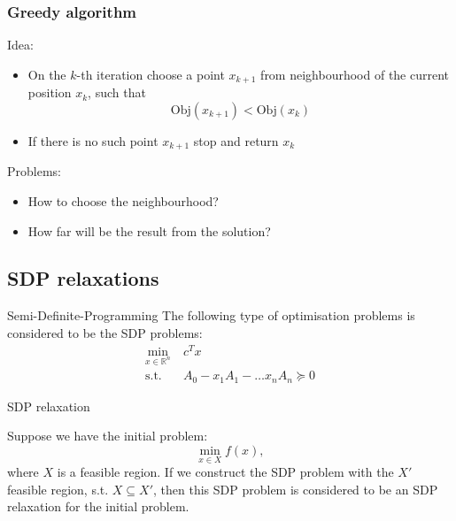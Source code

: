 \documentclass[10pt]{beamer}
\begin{document}
	\begin{frame}
		\frametitle{Greedy algorithm}
		
		{\Large Idea:}
		\begin{itemize}
			\item On the $k$-th iteration choose a point $x_{k+1}$ from neighbourhood 
			of the current position $x_k$, such that
			\[
				\text{Obj}(x_{k+1}) < \text{Obj}(x_k)
			\]
			\item If there is no such point $x_{k+1}$ stop and return $x_k$
		\end{itemize}
	
		\vspace{0.2in}
		{\Large Problems:}
		\begin{itemize}
			\item How to choose the neighbourhood?
			\item How far will be the result from the solution?
		\end{itemize}
	
	\end{frame}


    \subsection{SDP relaxations}

        \begin{frame}{Semi-Definite-Programming}
            The following type of optimisation problems is considered to be the SDP problems:
            \begin{align*}
                \min_{x \in \mathbb{R}^n} &~c^Tx\\
                \text{s.t.} &~A_0 - x_1A_1 - \dots x_nA_n \succeq 0
            \end{align*}
            
        \end{frame}
        
        \begin{frame}{SDP relaxation}
        
            Suppose we have the initial problem:
            \[
                \min_{x \in X} f(x),
            \]
            where $X$ is a feasible region. If we construct the SDP problem with the $X'$ feasible region, s.t. $X \subseteq X'$, then this SDP problem is considered to be an SDP relaxation for the initial problem.
            
            
        \end{frame}
	
\end{document}
